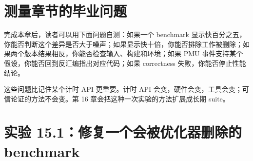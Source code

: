 \section{测量章节的毕业问题}

完成本章后，读者可以用下面问题自测：如果一个 benchmark 显示快百分之五，你能否判断这个差异是否大于噪声；如果显示快十倍，你能否排除工作被删除；如果两个版本结果相反，你能否检查输入、构建和环境；如果 PMU 事件支持某个假设，你能否回到反汇编指出对应代码；如果 correctness 失败，你能否停止性能结论。

这些问题比记住某个计时 API 更重要。计时 API 会变，硬件会变，工具会变；可信论证的方法不会变。第 16 章会把这种一次实验的方法扩展成长期 suite。

\section{实验 15.1：修复一个会被优化器删除的 benchmark}

